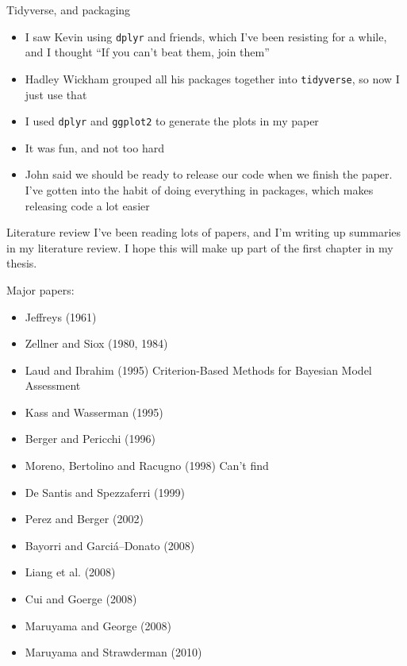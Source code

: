 \documentclass{beamer}
\begin{document}
\begin{frame}{Tidyverse, and packaging}
\begin{itemize}
\item I saw Kevin using \texttt{dplyr} and friends, which I've been resisting for a while, and I thought
``If you can't beat them, join them''
\item Hadley Wickham grouped all his packages together into \texttt{tidyverse}, so now I just use that
\item I used \texttt{dplyr} and \texttt{ggplot2} to generate the plots in my paper
\item It was fun, and not too hard
\item John said we should be ready to release our code when we finish the paper. I've gotten into the
habit of doing everything in packages, which makes releasing code a lot easier
\end{itemize}
\end{frame}

\begin{frame}{Literature review}
	I've been reading lots of papers, and I'm writing up summaries in my literature review. I hope this will
	make up part of the first chapter in my thesis.
	
	Major papers:
	
	\begin{itemize}
		\item Jeffreys (1961)
		\item Zellner and Siox (1980, 1984)
		\item Laud and Ibrahim (1995) Criterion-Based Methods for Bayesian Model Assessment
		\item Kass and Wasserman (1995)
		\item Berger and Pericchi (1996)
		\item Moreno, Bertolino and Racugno (1998) Can't find
		\item De Santis and Spezzaferri (1999)
		\item Perez and Berger (2002)
		\item Bayorri and Garci\'{a}--Donato (2008)
		\item Liang et al. (2008)
		\item Cui and Goerge (2008)
		\item Maruyama and George (2008)
		\item Maruyama and Strawderman (2010)
	\end{itemize}
\end{frame}
\end{document}
